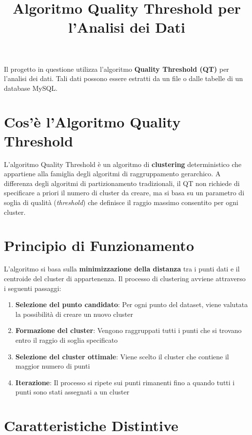 \documentclass{article}
\title{Algoritmo Quality Threshold per l'Analisi dei Dati}
\author{}
\date{}
\begin{document}
\maketitle

Il progetto in questione utilizza l'algoritmo \textbf{Quality Threshold (QT)} per l'analisi dei dati. Tali dati possono essere estratti da un file o dalle tabelle di un database MySQL.

\section{Cos'è l'Algoritmo Quality Threshold}

L'algoritmo Quality Threshold è un algoritmo di \textbf{clustering} deterministico che appartiene alla famiglia degli algoritmi di raggruppamento gerarchico. A differenza degli algoritmi di partizionamento tradizionali, il QT non richiede di specificare a priori il numero di cluster da creare, ma si basa su un parametro di soglia di qualità (\textit{threshold}) che definisce il raggio massimo consentito per ogni cluster.

\section{Principio di Funzionamento}

L'algoritmo si basa sulla \textbf{minimizzazione della distanza} tra i punti dati e il centroide del cluster di appartenenza. Il processo di clustering avviene attraverso i seguenti passaggi:

\begin{enumerate}
\item \textbf{Selezione del punto candidato}: Per ogni punto del dataset, viene valutata la possibilità di creare un nuovo cluster
\item \textbf{Formazione del cluster}: Vengono raggruppati tutti i punti che si trovano entro il raggio di soglia specificato
\item \textbf{Selezione del cluster ottimale}: Viene scelto il cluster che contiene il maggior numero di punti
\item \textbf{Iterazione}: Il processo si ripete sui punti rimanenti fino a quando tutti i punti sono stati assegnati a un cluster
\end{enumerate}

\section{Caratteristiche Distintive}
\end{document}
